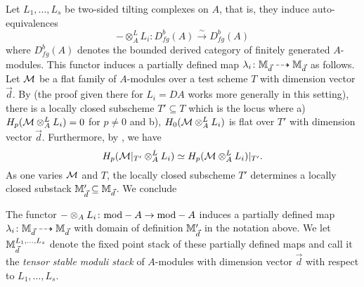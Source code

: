 \documentclass[12pt]{amsart}
\begin{document}
Let $L_1,\ldots, L_s$ be two-sided tilting complexes on $A$, that is, they induce auto-equivalences 
$$- \otimes^L_A L_i \colon D^b_{fg}(A) \xrightarrow{\sim} D^b_{fg}(A)$$
where $D^b_{fg}(A)$ denotes the bounded derived category of finitely generated $A$-modules. This functor induces a partially defined map $\lambda_i \colon \mathbb{M}_{\vec{d}} \dashrightarrow \mathbb{M}_{\vec{d}}$ as follows. Let $\mathcal{M}$ be a flat family of $A$-modules over a test scheme $T$ with dimension vector $\vec{d}$. By \cite[Proposition~3.3]{CL} (the proof given there for $L_i = DA$ works more generally in this setting), there is a locally closed subscheme $T' \subseteq T$ which is the locus where a) $H_p(\mathcal{M} \otimes^L_A L_i) = 0$ for $p\neq 0$ and b), $H_0(\mathcal{M} \otimes^L_A L_i)$ is flat over $T'$ with dimension vector $\vec{d}$. Furthermore, by \cite[Lemma~3.2]{CL}, we have
$$ H_p(\mathcal{M}|_{T'} \otimes^L_A L_i) \simeq H_p(\mathcal{M} \otimes^L_A L_i)|_{T'} .$$
As one varies $\mathcal{M}$ and $T$, the locally closed subscheme $T'$ determines a locally closed substack $\mathbb{M}_{\vec{d}}' \subseteq \mathbb{M}_{\vec{d}}$. We conclude
\begin{proposition}  \label{prop:lambdamap}
The functor $- \otimes_A L_i \colon \textup{mod}-A \to \textup{mod}-A$ induces a partially defined map $\lambda_i \colon \mathbb{M}_{\vec{d}} \dashrightarrow \mathbb{M}_{\vec{d}}$ with domain of definition $\mathbb{M}_{\vec{d}}'$ in the notation above. We let $\mathbb{M}_{\vec{d}}^{L_1,\ldots,L_s}$ denote the fixed point stack of these partially defined maps and call it the {\em tensor stable moduli stack} of $A$-modules with dimension vector $\vec{d}$ with respect to $L_1,\ldots, L_s$. 
\end{proposition}
\end{document}
